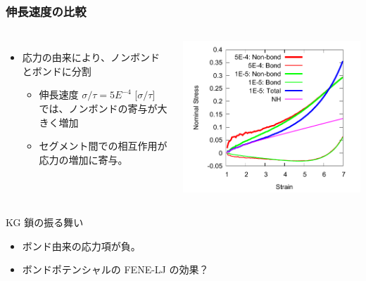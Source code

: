 \documentclass[11pt, dvipdfmx]{beamer}
\begin{document}
\begin{frame}
\frametitle{伸長速度の比較}

\begin{columns}[totalwidth=1\textwidth]
\begin{itemize}
\item
応力の由来により、ノンボンドとボンドに分割

\begin{itemize}
\item
伸長速度 $\sigma/\tau = 5E^{-4}$ [$\sigma/\tau$] では、ノンボンドの寄与が大きく増加
\item
セグメント間での相互作用が応力の増加に寄与。
\end{itemize}
\end{itemize}

\includegraphics[width=\columnwidth]{./fig/SS_bond.pdf}
\end{columns}

\begin{block}{KG 鎖の振る舞い}
\begin{itemize}
\item
ボンド由来の応力項が負。
\item
ボンドポテンシャルの FENE-LJ の効果？
\end{itemize}
\end{block}

\end{frame}
\end{document}
